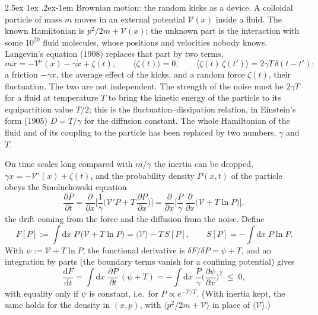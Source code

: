 \documentclass[10pt,a4paper]{article}
\makeatletter
\renewcommand{\paragraph}{\@startsection{paragraph}{4}{\z@}%
  {2.5ex \@plus 1ex \@minus .2ex}{-1em}%
  {\normalfont\fontsize{14pt}{17pt}\selectfont\bfseries}}
\newcommand{\dd}{\mathrm{d}}
\makeatother
\begin{document}
\paragraph{Brownian motion: the random kicks as a device.}
A colloidal particle of mass $ m $ moves in an external potential $ \mathcal{V}(x) $ inside a fluid.
The known Hamiltonian is $ p^{2}/2m + \mathcal{V}(x) $; the unknown part is the interaction with some $ 10^{20} $ fluid molecules, whose positions and velocities nobody knows.
Langevin's equation (1908) replaces that part by two terms,
\[
  m\ddot x = -\mathcal{V}'(x) - \gamma\dot x + \zeta(t) , \qquad
  \langle\zeta(t)\rangle = 0 , \qquad
  \langle\zeta(t)\,\zeta(t')\rangle = 2\gamma T\,\delta(t - t') :
\]
a friction $ -\gamma\dot x $, the average effect of the kicks, and a random force $ \zeta(t) $, their fluctuation.
The two are not independent.
The strength of the noise must be $ 2\gamma T $ for a fluid at temperature $ T $ to bring the kinetic energy of the particle to its equipartition value $ T/2 $; this is the fluctuation--dissipation relation, in Einstein's form (1905) $ D = T/\gamma $ for the diffusion constant.
The whole Hamiltonian of the fluid and of its coupling to the particle has been replaced by two numbers, $ \gamma $ and $ T $.

On time scales long compared with $ m/\gamma $ the inertia can be dropped, $ \gamma\dot x = -\mathcal{V}'(x) + \zeta(t) $, and the probability density $ P(x, t) $ of the particle obeys the Smoluchowski equation
\[
  \frac{\partial P}{\partial t}
  = \frac{\partial}{\partial x}\bigg[\frac{1}{\gamma}\Big(\mathcal{V}'P + T\,\frac{\partial P}{\partial x}\Big)\bigg]
  = \frac{\partial}{\partial x}\bigg[\frac{P}{\gamma}\,\frac{\partial}{\partial x}\big(\mathcal{V} + T\ln P\big)\bigg] ,
\]
the drift coming from the force and the diffusion from the noise.
Define
\[
  F[P] := \int \dd x\;P\,\big(\mathcal{V} + T\ln P\big)
  = \langle\mathcal{V}\rangle - T\,S[P] , \qquad
  S[P] = -\int \dd x\;P\ln P .
\]
With $ \psi := \mathcal{V} + T\ln P $, the functional derivative is $ \delta F/\delta P = \psi + T $, and an integration by parts (the boundary terms vanish for a confining potential) gives
\[
  \frac{\dd F}{\dd t} = \int \dd x\;\frac{\partial P}{\partial t}\,(\psi + T)
  = -\int \dd x\;\frac{P}{\gamma}\Big(\frac{\partial\psi}{\partial x}\Big)^{2} \;\leq\; 0 ,
\]
with equality only if $ \psi $ is constant, i.e.\ for $ P \propto e^{-\mathcal{V}/T} $.
(With inertia kept, the same holds for the density in $ (x, p) $, with $ \langle p^{2}/2m + \mathcal{V}\rangle $ in place of $ \langle\mathcal{V}\rangle $.)
\end{document}
